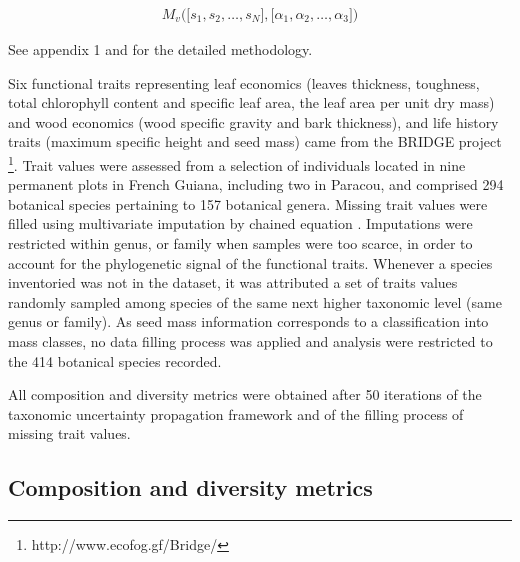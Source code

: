 \documentclass[fleqn,10pt]{ArtEcoFoG} %
\theoremstyle{definition}
\theoremstyle{definition}
\theoremstyle{definition}
\theoremstyle{remark}
\begin{document}
\begin{align}
M_v\Big(\big[s_1, s_2, …, s_N\big],\big[\alpha_1, \alpha_2,…, \alpha_3\big]\Big) \nonumber
\end{align}

See appendix 1 and \citet{Aubry-Kientz2013} for the detailed
methodology.

Six functional traits
representing leaf economics (leaves thickness, toughness, total
chlorophyll content and specific leaf area, the leaf area per unit dry
mass) and wood economics (wood specific gravity and bark thickness), and
life history traits (maximum specific height and seed mass) came from the BRIDGE project \footnote{http://www.ecofog.gf/Bridge/}. Trait values were assessed from a selection of individuals located
in nine permanent plots in French Guiana, including two in Paracou, and
comprised 294 botanical species pertaining to 157 botanical genera.
Missing trait values were filled using multivariate imputation by
chained equation \citep{Mice2011}.
Imputations were restricted within genus, or family when samples were too
scarce, in order to account for the phylogenetic signal of the
functional traits. Whenever a species inventoried was not in the
dataset, it was attributed a set of traits values randomly sampled among
species of the same next higher taxonomic level (same genus or family).
As seed mass information corresponds to a classification into mass
classes, no data filling process was applied and analysis were
restricted to the 414 botanical species recorded.

All composition and diversity metrics were
obtained after 50 iterations of the taxonomic uncertainty propagation
framework and of the filling process of missing trait values.

\subsection{Composition and diversity
metrics}\label{composition-and-diversity-metrics}
\end{document}
